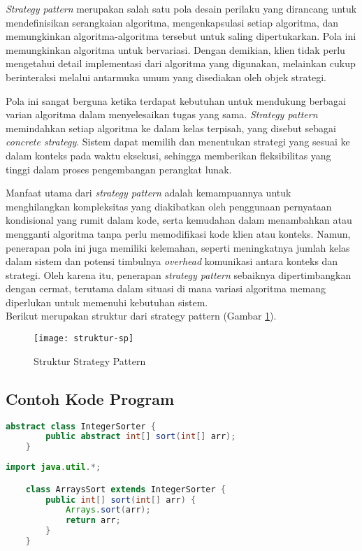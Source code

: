 \textit{Strategy pattern} merupakan salah satu pola desain perilaku yang dirancang untuk mendefinisikan serangkaian algoritma, mengenkapsulasi setiap algoritma, dan memungkinkan algoritma-algoritma tersebut untuk saling dipertukarkan. Pola ini memungkinkan algoritma untuk bervariasi. Dengan demikian, klien tidak perlu mengetahui detail implementasi dari algoritma yang digunakan, melainkan cukup berinteraksi melalui antarmuka umum yang disediakan oleh objek strategi.

Pola ini sangat berguna ketika terdapat kebutuhan untuk mendukung berbagai varian algoritma dalam menyelesaikan tugas yang sama. \textit{Strategy pattern} memindahkan setiap algoritma ke dalam kelas terpisah, yang disebut sebagai \textit{concrete strategy}. Sistem dapat memilih dan menentukan strategi yang sesuai ke dalam konteks pada waktu eksekusi, sehingga memberikan fleksibilitas yang tinggi dalam proses pengembangan perangkat lunak.

Manfaat utama dari \textit{strategy pattern} adalah kemampuannya untuk menghilangkan kompleksitas yang diakibatkan oleh penggunaan pernyataan kondisional yang rumit dalam kode, serta kemudahan dalam menambahkan atau mengganti algoritma tanpa perlu memodifikasi kode klien atau konteks. Namun, penerapan pola ini juga memiliki kelemahan, seperti meningkatnya jumlah kelas dalam sistem dan potensi timbulnya \textit{overhead} komunikasi antara konteks dan strategi. Oleh karena itu, penerapan \textit{strategy pattern} sebaiknya dipertimbangkan dengan cermat, terutama dalam situasi di mana variasi algoritma memang diperlukan untuk memenuhi kebutuhan sistem.
\\
Berikut merupakan struktur dari strategy pattern (Gambar \ref{fig:struktursp}).
\begin{figure}[h] 
	\centering  
	\texttt{[image: struktur-sp]}  
	\caption{Struktur Strategy Pattern}
	\label{fig:struktursp} 
\end{figure}
\newpage
\subsection{Contoh Kode Program}
\label{sec:kode}
\begin{lstlisting}[language=Java, caption=IntegerSorter.java, basicstyle=\small\ttfamily]
    abstract class IntegerSorter {
        public abstract int[] sort(int[] arr);
    }
\end{lstlisting}

\begin{lstlisting}[language=Java, caption=ArraysSort.java, basicstyle=\small\ttfamily]
    import java.util.*;

    class ArraysSort extends IntegerSorter {
        public int[] sort(int[] arr) {
            Arrays.sort(arr);
            return arr;
        }
    }
\end{lstlisting}

